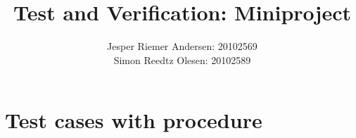 \documentclass[a4paper,12pt]{report}
\title{Test and Verification: Miniproject}
\author{Jesper Riemer Andersen: 20102569\\Simon Reedtz Olesen: 20102589}
\begin{document}
\maketitle

\pagebreak
\section*{Test cases with procedure}


\end{document}
